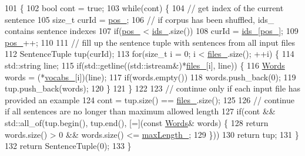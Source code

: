 \begin{DoxyCode}
101                            \{
102   \textcolor{keywordtype}{bool} cont = \textcolor{keyword}{true};
103   \textcolor{keywordflow}{while}(cont) \{
104     \textcolor{comment}{// get index of the current sentence}
105     \textcolor{keywordtype}{size\_t} curId = \hyperlink{classmarian_1_1data_1_1Corpus_a71f13714f2aba56a3784f4416656dcce}{pos\_};
106     \textcolor{comment}{// if corpus has been shuffled, ids\_ contains sentence indexes}
107     \textcolor{keywordflow}{if}(\hyperlink{classmarian_1_1data_1_1Corpus_a71f13714f2aba56a3784f4416656dcce}{pos\_} < \hyperlink{classmarian_1_1data_1_1Corpus_af61cc6f764d82fa6764d7faa6c7c29d8}{ids\_}.size())
108       curId = \hyperlink{classmarian_1_1data_1_1Corpus_af61cc6f764d82fa6764d7faa6c7c29d8}{ids\_}[\hyperlink{classmarian_1_1data_1_1Corpus_a71f13714f2aba56a3784f4416656dcce}{pos\_}];
109     \hyperlink{classmarian_1_1data_1_1Corpus_a71f13714f2aba56a3784f4416656dcce}{pos\_}++;
110 
111     \textcolor{comment}{// fill up the sentence tuple with sentences from all input files}
112     SentenceTuple tup(curId);
113     \textcolor{keywordflow}{for}(\textcolor{keywordtype}{size\_t} i = 0; i < \hyperlink{classmarian_1_1data_1_1Corpus_a3f3028cb2032b3b4629883fb48328851}{files\_}.size(); ++i) \{
114       std::string line;
115       \textcolor{keywordflow}{if}(std::getline((std::istream&)*\hyperlink{classmarian_1_1data_1_1Corpus_a3f3028cb2032b3b4629883fb48328851}{files\_}[i], line)) \{
116         \hyperlink{namespacemarian_a5385eef6e49dd8f789f616ef579dea3f}{Words} words = (*\hyperlink{classmarian_1_1data_1_1Corpus_a25b11761814f5a8f383d1b8d81bcc869}{vocabs\_}[i])(line);
117         \textcolor{keywordflow}{if}(words.empty())
118           words.push\_back(0);
119         tup.push\_back(words);
120       \}
121     \}
122 
123     \textcolor{comment}{// continue only if each input file has provided an example}
124     cont = tup.size() == \hyperlink{classmarian_1_1data_1_1Corpus_a3f3028cb2032b3b4629883fb48328851}{files\_}.size();
125 
126     \textcolor{comment}{// continue if all sentences are no longer than maximum allowed length}
127     \textcolor{keywordflow}{if}(cont && std::all\_of(tup.begin(), tup.end(), [=](\textcolor{keyword}{const} \hyperlink{namespacemarian_a5385eef6e49dd8f789f616ef579dea3f}{Words}& words) \{
128          \textcolor{keywordflow}{return} words.size() > 0 && words.size() <= \hyperlink{classmarian_1_1data_1_1Corpus_a319aa74a24b0f7e865defbb17db817fe}{maxLength\_};
129        \}))
130       \textcolor{keywordflow}{return} tup;
131   \}
132   \textcolor{keywordflow}{return} SentenceTuple(0);
133 \}
\end{DoxyCode}


